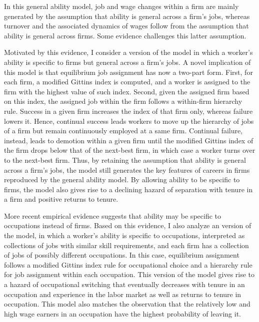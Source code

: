 \documentclass[12pt]{article}
\newcommand{\highlightB}[1]{{\emph{\color{MyBlue}{#1}}}}
\theoremstyle{definition}
\begin{document}
In this general ability model, job and wage changes within a firm are mainly generated by the assumption that ability is general across a firm's jobs, whereas turnover and the associated dynamics of wages follow from the assumption that ability is general across firms. Some evidence challenges this latter assumption. 

Motivated by this evidence, I consider a \highlightB{firm-specific} version of the model in which a worker's ability is specific to firms but general across a firm's jobs. A novel implication of this model is that equilibrium job assignment has now a two-part form. First, for each firm, a modified Gittins index is computed, and a worker is assigned to the firm with the highest value of such index. Second, given the assigned firm based on this index, the assigned job within the firm follows a within-firm hierarchy rule. Success in a given firm increases the index of that firm only, whereas failure lowers it. Hence, continual success leads workers to move up the hierarchy of jobs of a firm but remain continuously employed at a same firm. Continual failure, instead, leads to demotion within a given firm until the modified Gittins index of the firm drops below that of the next-best firm, in which case a worker turns over to the next-best firm. Thus, by retaining the assumption that ability is general across a firm's jobs, the model still generates the key features of careers in firms reproduced by the general ability model. By allowing ability to be specific to firms, the model also gives rise to a declining hazard of separation with tenure in a firm and positive returns to tenure. 

More recent empirical evidence suggests that ability may be specific to occupations instead of firms. Based on this evidence, I also analyze an \highlightB{occupation-specific} version of the model, in which a worker's ability is specific to occupations, interpreted as collections of jobs with similar skill requirements, and each firm has a collection of jobs of possibly different occupations. In this case, equilibrium assignment follows a modified Gittins index rule for occupational choice and a hierarchy rule for job assignment within each occupation. This version of the model gives rise to a hazard of occupational switching that eventually decreases with tenure in an occupation and experience in the labor market as well as returns to tenure in occupation. This model also matches the observation that the relatively low and high wage earners in an occupation have the highest probability of leaving it. 
\end{document}
